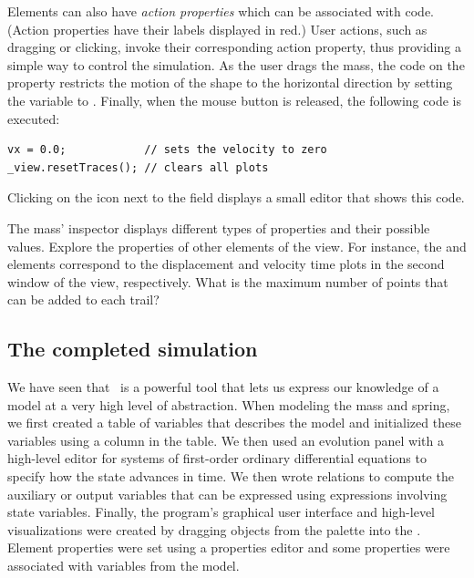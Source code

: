 Elements can also have \emph{action properties} which can be associated with code.
(Action properties have their labels displayed in red.) User actions, such as dragging or clicking, invoke their
corresponding action property, thus providing a simple way to control the simulation. As the user drags the mass, the code on the  property restricts the motion of the shape to the horizontal direction by setting the  variable to .  Finally, when the mouse button is
released, the following code is executed:

\begin{listing}
\begin{verbatim}
vx = 0.0;            // sets the velocity to zero
_view.resetTraces(); // clears all plots
\end{verbatim}
\end{listing}

\noindent Clicking on the icon next to the field displays a small editor that shows this code.


\begin{exercise}\label{ex:02ExplorationJava/properties}
The mass' inspector displays different types of properties and their possible values. Explore the properties of other
elements of the view.  For instance, the  and  elements correspond to the
displacement and velocity time plots in the second window of the view, respectively.  What is the maximum number of points that can be added to each trail?
\end{exercise}

\subsection{The completed simulation}

We have seen that \Ejs\ is a powerful tool that lets us express our knowledge of a model at a very high level of abstraction. When modeling the mass and spring, we first created a table of variables that describes the model and initialized these variables using a column in the table. We then used an evolution panel with a high-level editor for systems of first-order ordinary differential equations to specify how the state advances in time. We then wrote relations to compute the auxiliary or output variables that can be expressed using expressions involving state variables.  Finally, the program's graphical user interface and high-level visualizations were created by dragging objects from the  palette into the . Element properties were set using a properties editor and some properties were associated with variables from the model.

